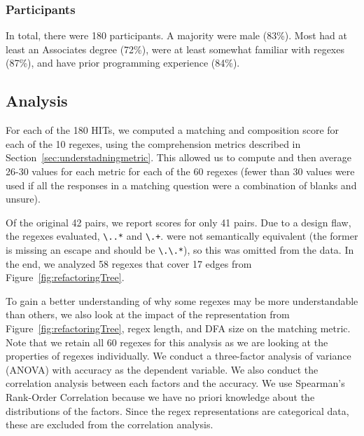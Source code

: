 \subsubsection{Participants}

In total, there were 180 participants.
A majority were male (83\%). %
Most had
at least an Associates degree (72\%), were at least somewhat familiar with regexes (87\%), and have prior programming experience (84\%).




\subsection{Analysis}
For each of the 180 HITs, we computed a matching and composition score for each of the 10 regexes, using the comprehension metrics described in Section~\ref{sec:understadningmetric}. This allowed us to compute and then average 26-30 values for each metric  for each of the 60 regexes (fewer than 30 values were used if all the responses in a matching question were a combination of blanks and unsure). %


Of the original 42 pairs, we report scores for only 41 pairs. Due to a design flaw, the regexes evaluated, \verb!\..*! and \verb!\.+!. were not semantically equivalent (the former is missing an escape and should be \verb!\.\.*!), so this was omitted from the data. In the end, we analyzed 58 regexes that cover  17 edges from Figure~\ref{fig:refactoringTree}.

To gain a better understanding of why some regexes may be more understandable than others, we also look at the impact of the representation from Figure~\ref{fig:refactoringTree}, regex  length, and DFA size on the matching metric. 
Note that  we retain all 60 regexes for this analysis as we are looking at the properties of regexes individually. 
We conduct a three-factor analysis of variance (ANOVA) with accuracy as the dependent variable.
We also conduct the correlation analysis between each factors and the accuracy. 
We use Spearman's Rank-Order Correlation because we have no priori knowledge about the distributions of the factors. 
Since  the regex representations are categorical data, these are excluded from the correlation analysis. 



